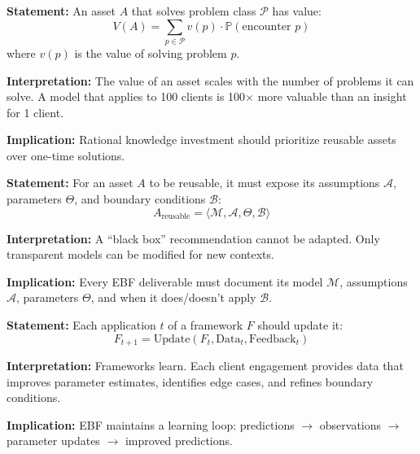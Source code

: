 \begin{tcolorbox}[colback=gray!5!white, colframe=gray!75!black,
    title=Axiom UNMAPPED_FM-1: Reusability Principle]
\textbf{Statement:} An asset $A$ that solves problem class $\mathcal{P}$ has value:
\begin{equation}
V(A) = \sum_{p \in \mathcal{P}} v(p) \cdot \mathbb{P}(\text{encounter } p)
\end{equation}
where $v(p)$ is the value of solving problem $p$.

\textbf{Interpretation:} The value of an asset scales with the number of problems it can solve. A model that applies to 100 clients is 100$\times$ more valuable than an insight for 1 client.

\textbf{Implication:} Rational knowledge investment should prioritize reusable assets over one-time solutions.
\end{tcolorbox}

\begin{tcolorbox}[colback=gray!5!white, colframe=gray!75!black,
    title=Axiom UNMAPPED_FM-2: Transparency Principle]
\textbf{Statement:} For an asset $A$ to be reusable, it must expose its assumptions $\mathcal{A}$, parameters $\Theta$, and boundary conditions $\mathcal{B}$:
\begin{equation}
A_{\text{reusable}} = \langle \mathcal{M}, \mathcal{A}, \Theta, \mathcal{B} \rangle
\end{equation}

\textbf{Interpretation:} A ``black box'' recommendation cannot be adapted. Only transparent models can be modified for new contexts.

\textbf{Implication:} Every EBF deliverable must document its model $\mathcal{M}$, assumptions $\mathcal{A}$, parameters $\Theta$, and when it does/doesn't apply $\mathcal{B}$.
\end{tcolorbox}

\begin{tcolorbox}[colback=gray!5!white, colframe=gray!75!black,
    title=Axiom UNMAPPED_FM-3: Cumulative Growth Principle]
\textbf{Statement:} Each application $t$ of a framework $F$ should update it:
\begin{equation}
F_{t+1} = \text{Update}(F_t, \text{Data}_t, \text{Feedback}_t)
\end{equation}

\textbf{Interpretation:} Frameworks learn. Each client engagement provides data that improves parameter estimates, identifies edge cases, and refines boundary conditions.

\textbf{Implication:} EBF maintains a learning loop: predictions $\to$ observations $\to$ parameter updates $\to$ improved predictions.
\end{tcolorbox}

